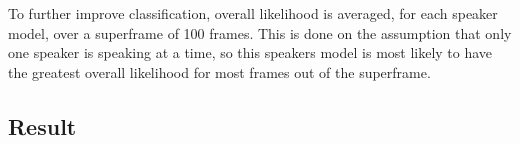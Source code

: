 To further improve classification, overall likelihood is averaged, for each speaker model, over a superframe of 100 frames.
This is done on the assumption that only one speaker is speaking at a time, so this speakers model is most likely to have the greatest overall likelihood for most frames out of the superframe.

\subsection*{Result}
